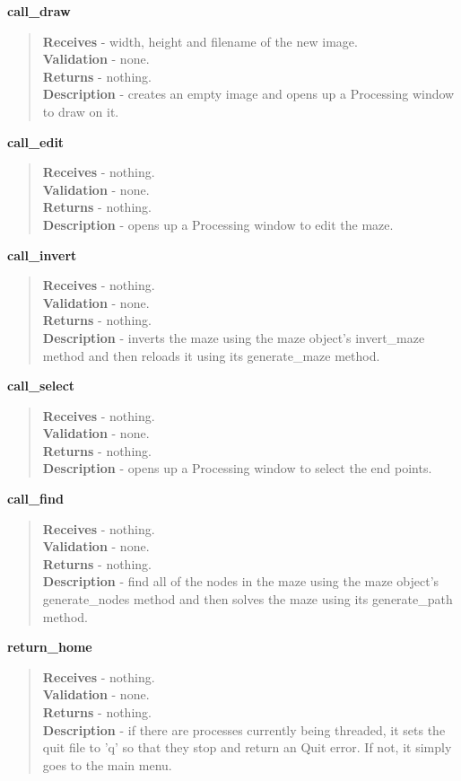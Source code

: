 \documentclass[titlepage]{article}
\begin{document}
\textbf{call\_draw}
\begin{quote}
\textbf{Receives} - width, height and filename of the new image. \\
\textbf{Validation} - none.\\
\textbf{Returns} - nothing. \\
\textbf{Description} - creates an empty image and opens up a Processing window to draw on it.
\end{quote}

\textbf{call\_edit}
\begin{quote}
\textbf{Receives} - nothing. \\
\textbf{Validation} - none.\\
\textbf{Returns} - nothing. \\
\textbf{Description} - opens up a Processing window to edit the maze.
\end{quote}

\textbf{call\_invert}
\begin{quote}
\textbf{Receives} - nothing. \\
\textbf{Validation} - none.\\
\textbf{Returns} - nothing. \\
\textbf{Description} - inverts the maze using the maze object's invert\_maze method and then reloads it using its generate\_maze method.
\end{quote}

\textbf{call\_select}
\begin{quote}
\textbf{Receives} - nothing. \\
\textbf{Validation} - none.\\
\textbf{Returns} - nothing. \\
\textbf{Description} - opens up a Processing window to select the end points.
\end{quote}

\textbf{call\_find}
\begin{quote}
\textbf{Receives} - nothing. \\
\textbf{Validation} - none.\\
\textbf{Returns} - nothing. \\
\textbf{Description} - find all of the nodes in the maze using the maze object's generate\_nodes method and then solves the maze using its generate\_path method. 
\end{quote}

\textbf{return\_home}
\begin{quote}
\textbf{Receives} - nothing. \\
\textbf{Validation} - none.\\
\textbf{Returns} - nothing. \\
\textbf{Description} - if there are processes currently being threaded, it sets the quit file to 'q' so that they stop and return an Quit error. If not, it simply goes to the main menu.
\end{quote}
\end{document}
